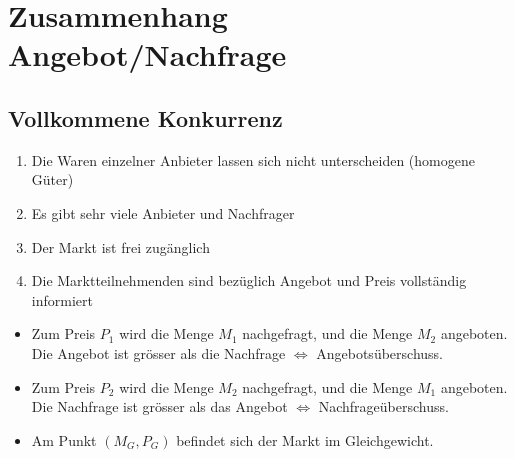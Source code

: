\section{Zusammenhang Angebot/Nachfrage}
\subsection{Vollkommene Konkurrenz}
\begin{enumerate}\itemsep0em
	\item Die Waren einzelner Anbieter lassen sich nicht unterscheiden (homogene Güter)
	\item Es gibt sehr viele Anbieter und Nachfrager
	\item Der Markt ist frei zugänglich
	\item Die Marktteilnehmenden sind bezüglich Angebot und Preis vollständig informiert
\end{enumerate}

\begin{center}
\end{center}

\begin{itemize}\itemsep0em
	\item Zum Preis $P_1$ wird die Menge $M_1$ nachgefragt, und die Menge $M_2$ angeboten.
	Die Angebot ist grösser als die Nachfrage $\Leftrightarrow$ Angebotsüberschuss.
	\item Zum Preis $P_2$ wird die Menge $M_2$ nachgefragt, und die Menge $M_1$ angeboten.
	Die Nachfrage ist grösser als das Angebot $\Leftrightarrow$ Nachfrageüberschuss.
	\item Am Punkt $(M_G, P_G)$ befindet sich der Markt im Gleichgewicht.
\end{itemize}

